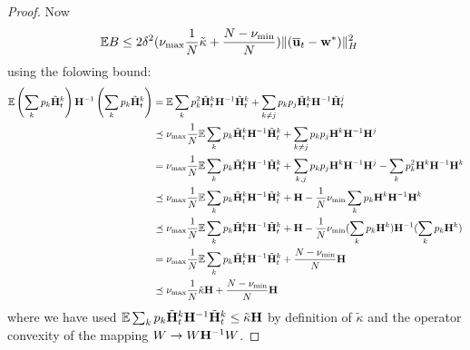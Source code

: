 \begin{proof}
	Now 
	\begin{align*}
	\mathbb{E}B & \leq2\delta^{2}(\nu_{\max}\frac{1}{N}\tilde{\kappa}+\frac{N-\nu_{\min}}{N})\|({\overline{\mathbf{u}}}_{t}-{\mathbf{w}}^{\ast})\|_{H}^{2}
	\end{align*}
	using the folowing bound: 
	\begin{align*}
	\mathbb{E}\left(\sum_{k}p_{k}\tilde{{\mathbf{H}}}_{t}^{k}\right){\mathbf{H}}^{-1}\left(\sum_{k}p_{k}\tilde{{\mathbf{H}}}_{t}^{k}\right) & =\mathbb{E}\sum_{k}p_{k}^{2}\tilde{{\mathbf{H}}}_{t}^{k}{\mathbf{H}}^{-1}\tilde{{\mathbf{H}}}_{t}^{k}+\sum_{k\neq j}p_{k}p_{j}\tilde{{\mathbf{H}}}_{t}^{k}{\mathbf{H}}^{-1}\tilde{{\mathbf{H}}}_{t}^{j}\\
	& \preceq\nu_{\max}\frac{1}{N}\mathbb{E}\sum_{k}p_{k}\tilde{{\mathbf{H}}}_{t}^{k}{\mathbf{H}}^{-1}\tilde{{\mathbf{H}}}_{t}^{k}+\sum_{k\neq j}p_{k}p_{j}{\mathbf{H}}^{k}{\mathbf{H}}^{-1}{\mathbf{H}}^{j}\\
	& =\nu_{\max}\frac{1}{N}\mathbb{E}\sum_{k}p_{k}\tilde{{\mathbf{H}}}_{t}^{k}{\mathbf{H}}^{-1}\tilde{{\mathbf{H}}}_{t}^{k}+\sum_{k,j}p_{k}p_{j}{\mathbf{H}}^{k}{\mathbf{H}}^{-1}{\mathbf{H}}^{j}-\sum_{k}p_{k}^{2}{\mathbf{H}}^{k}{\mathbf{H}}^{-1}{\mathbf{H}}^{k}\\
	& \preceq\nu_{\max}\frac{1}{N}\mathbb{E}\sum_{k}p_{k}\tilde{{\mathbf{H}}}_{t}^{k}{\mathbf{H}}^{-1}\tilde{{\mathbf{H}}}_{t}^{k}+{\mathbf{H}}-\frac{1}{N}\nu_{\min}\sum_{k}p_{k}{\mathbf{H}}^{k}{\mathbf{H}}^{-1}{\mathbf{H}}^{k}\\
	& \preceq\nu_{\max}\frac{1}{N}\mathbb{E}\sum_{k}p_{k}\tilde{{\mathbf{H}}}_{t}^{k}{\mathbf{H}}^{-1}\tilde{{\mathbf{H}}}_{t}^{k}+{\mathbf{H}}-\frac{1}{N}\nu_{\min}(\sum_{k}p_{k}{\mathbf{H}}^{k}){\mathbf{H}}^{-1}(\sum_{k}p_{k}{\mathbf{H}}^{k})\\
	& =\nu_{\max}\frac{1}{N}\mathbb{E}\sum_{k}p_{k}\tilde{{\mathbf{H}}}_{t}^{k}{\mathbf{H}}^{-1}\tilde{{\mathbf{H}}}_{t}^{k}+\frac{N-\nu_{\min}}{N}{\mathbf{H}}\\
	& \preceq\nu_{\max}\frac{1}{N}\tilde{\kappa}{\mathbf{H}}+\frac{N-\nu_{\min}}{N}{\mathbf{H}}
	\end{align*}
	where we have used $\mathbb{E}\sum_{k}p_{k}\tilde{{\mathbf{H}}}_{t}^{k}{\mathbf{H}}^{-1}\tilde{{\mathbf{H}}}_{t}^{k}\leq\tilde{\kappa}{\mathbf{H}}$
	by definition of $\tilde{\kappa}$ and the operator convexity of the
	mapping $W\rightarrow W{\mathbf{H}}^{-1}W$.
	

\end{proof}
